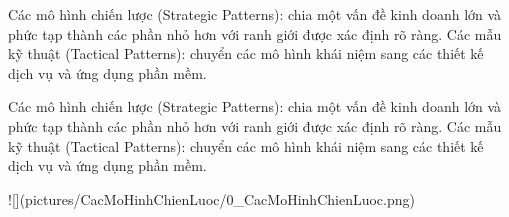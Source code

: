 Các mô hình chiến lược (Strategic Patterns): chia một vấn đề kinh doanh lớn và phức tạp thành các phần nhỏ hơn với ranh giới được xác định rõ ràng.
Các mẫu kỹ thuật (Tactical Patterns): chuyển các mô hình khái niệm sang các thiết kế dịch vụ và ứng dụng phần mềm.



     


Các mô hình chiến lược (Strategic Patterns): chia một vấn đề kinh doanh lớn và phức tạp thành các phần nhỏ hơn với ranh giới được xác định rõ ràng.
Các mẫu kỹ thuật (Tactical Patterns): chuyển các mô hình khái niệm sang các thiết kế dịch vụ và ứng dụng phần mềm.



![](pictures/CacMoHinhChienLuoc/0_CacMoHinhChienLuoc.png)







